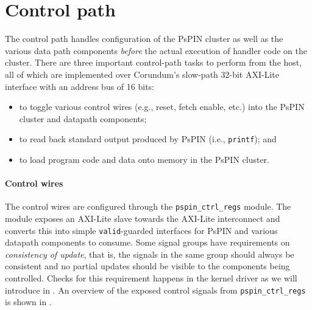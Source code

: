 \section{Control path}

The control path handles configuration of the PsPIN cluster as well as the various data path components \emph{before} the actual execution of handler code on the cluster.  There are three important control-path tasks to perform from the host, all of which are implemented over Corundum's slow-path 32-bit AXI-Lite interface with an address bus of 16 bits:

\begin{itemize}
    \item to toggle various control wires (e.g., reset, fetch enable, etc.) into the PsPIN cluster and datapath components;
    \item to read back standard output produced by PsPIN (i.e., \texttt{printf}); and
    \item to load program code and data onto memory in the PsPIN cluster.
\end{itemize}

\paragraph{Control wires} The control wires are configured through the \texttt{pspin\_ctrl\_regs} module.  The module exposes an AXI-Lite slave towards the AXI-Lite interconnect and converts this into simple \texttt{valid}-guarded interfaces for PsPIN and various datapath components to consume.  Some signal groups have requirements on \emph{consistency of update}, that is, the signals in the same group should always be consistent and no partial updates should be visible to the components being controlled.  Checks for this requirement happens in the kernel driver as we will introduce in .  An overview of the exposed control signals from \texttt{pspin\_ctrl\_regs} is shown in .

